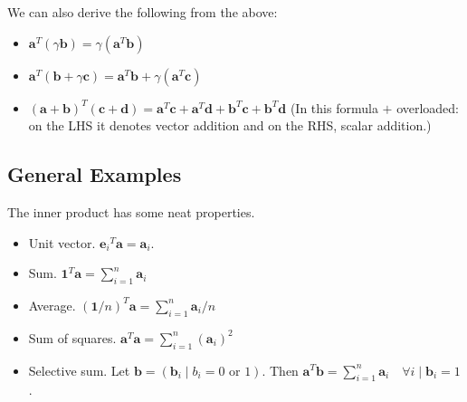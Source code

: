 \documentclass[11pt]{book}
\theoremstyle{definition}
\theoremstyle{plain}
\theoremstyle{problemstyle}
\theoremstyle{remark}
\theoremstyle{definition}
\begin{document}
We can also derive the following from the above:
\begin{itemize}
    \item $\boldsymbol{a}^T(\gamma\boldsymbol{b})=\gamma(\boldsymbol{a}^T\boldsymbol{b})$
    \item $\boldsymbol{a}^T(\boldsymbol{b}+\gamma\boldsymbol{c})=\boldsymbol{a}^T\boldsymbol{b}+\gamma(\boldsymbol{a}^T\boldsymbol{c})$
    \item $(\boldsymbol{a}+\boldsymbol{b})^T(\boldsymbol{c}+\boldsymbol{d})=\boldsymbol{a}^T\boldsymbol{c}+\boldsymbol{a}^T\boldsymbol{d}+\boldsymbol{b}^T\boldsymbol{c}+\boldsymbol{b}^T\boldsymbol{d}$ (In this formula $+$ overloaded: on the LHS it denotes vector addition and on the RHS, scalar addition.)
\end{itemize}

\subsection*{General Examples}
The inner product has some neat properties.
\label{ss:inner-product-ex}
\begin{itemize}
    \item Unit vector. ${\boldsymbol{e}_i}^T\boldsymbol{a}=\boldsymbol{a}_i$.
    \item Sum. $\boldsymbol{1}^T\boldsymbol{a}=\sum_{i=1}^{n}\boldsymbol{a}_i$
    \item Average. $({\boldsymbol{1}/n})^T\boldsymbol{a}=\sum_{i=1}^{n}\boldsymbol{a}_i/n$
    \item Sum of squares. ${\boldsymbol{a}}^T\boldsymbol{a}=\sum_{i=1}^{n}(\boldsymbol{a}_i)^2$
    \item Selective sum. Let $\boldsymbol{b}=(\boldsymbol{b}_i\mid b_i=0\text{ or }1)$. Then $\boldsymbol{a}^T\boldsymbol{b}=\sum_{i=1}^n\boldsymbol{a}_i\quad\forall i\mid\boldsymbol{b}_i=1$.
\end{itemize}
\end{document}
